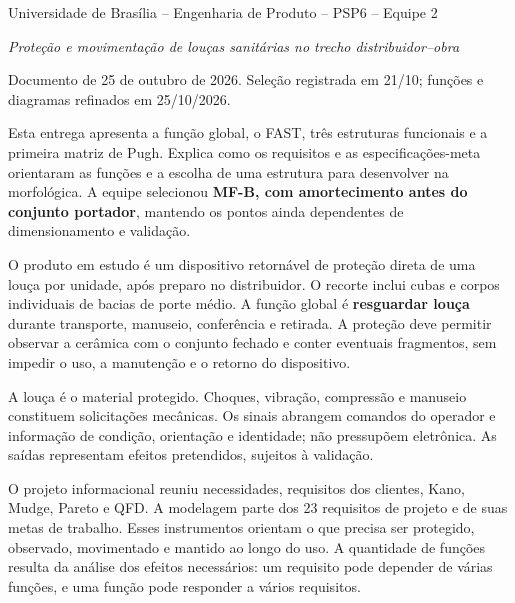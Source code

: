 \par
\vspace{4pt}
\noindent Universidade de Brasília -- Engenharia de Produto -- PSP6 -- Equipe 2\par
\noindent\textit{Proteção e movimentação de louças sanitárias no trecho distribuidor--obra}\par
\noindent\small Documento de 25 de outubro de 2026. Seleção registrada em 21/10; funções e diagramas refinados em 25/10/2026.\normalsize
\vspace{8pt}

Esta entrega apresenta a função global, o FAST, três estruturas funcionais e a primeira matriz de Pugh. Explica como os requisitos e as especificações-meta orientaram as funções e a escolha de uma estrutura para desenvolver na morfológica. A equipe selecionou \textbf{MF-B, com amortecimento antes do conjunto portador}, mantendo os pontos ainda dependentes de dimensionamento e validação.

O produto em estudo é um dispositivo retornável de proteção direta de uma louça por unidade, após preparo no distribuidor. O recorte inclui cubas e corpos individuais de bacias de porte médio. A função global é \textbf{resguardar louça} durante transporte, manuseio, conferência e retirada. A proteção deve permitir observar a cerâmica com o conjunto fechado e conter eventuais fragmentos, sem impedir o uso, a manutenção e o retorno do dispositivo.


\noindent\small A louça é o material protegido. Choques, vibração, compressão e manuseio constituem solicitações mecânicas. Os sinais abrangem comandos do operador e informação de condição, orientação e identidade; não pressupõem eletrônica. As saídas representam efeitos pretendidos, sujeitos à validação.\normalsize


O projeto informacional reuniu necessidades, requisitos dos clientes, Kano, Mudge, Pareto e QFD. A modelagem parte dos 23 requisitos de projeto e de suas metas de trabalho. Esses instrumentos orientam o que precisa ser protegido, observado, movimentado e mantido ao longo do uso. A quantidade de funções resulta da análise dos efeitos necessários: um requisito pode depender de várias funções, e uma função pode responder a vários requisitos.

